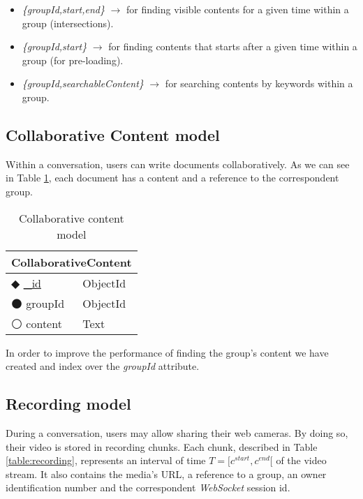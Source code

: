 \begin{itemize}
\item{\emph{\{groupId,start,end\}} $\rightarrow$ for finding visible contents for a given time  within a group (intersections).}
\item{\emph{\{groupId,start\}} $\rightarrow$  for finding contents that starts after a given time within a group (for pre-loading).}
\item{\emph{\{groupId,searchableContent\}} $\rightarrow$ for searching contents by keywords within a group.}  
\end{itemize}

\subsection{Collaborative Content model}

Within a conversation, users can write documents collaboratively. As we can see in Table \ref{table:collaborative}, each document has a content and a reference to the correspondent group. 


\begin{table}[!htb]
\centering
    \caption{Collaborative content model}
    \label{table:collaborative}
    \begin{tabular}{|ll|}
        \hline
        \multicolumn{2}{|c|}{\textbf{CollaborativeContent}} \\ \hline
        $\Diamondblack$ \underline{\_id}  & ObjectId        \\ 
        $\medbullet$ groupId            & ObjectId          \\ 
        $\medcirc$ content            & Text                \\ \hline
    \end{tabular}
\end{table}

In order to improve the performance of finding the group's content we have created and index over the \emph{groupId} attribute.

\subsection{Recording model}

During a conversation, users may allow sharing their web cameras. By doing so, their video is stored in recording chunks. Each chunk, described in Table \ref{table:recording}, represents an interval of time $T=\big[c^{start},c^{end}\big[$ of the video stream. It also contains the media's \ac{URL}, a reference to a group, an owner identification number and the correspondent \emph{WebSocket} session id.
    
